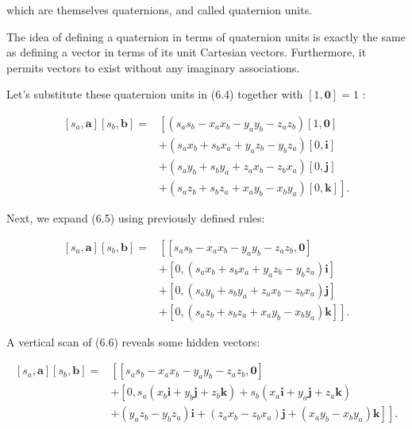 \documentclass[10pt]{article}
\begin{document}
which are themselves quaternions, and called quaternion units.

The idea of defining a quaternion in terms of quaternion units is exactly the same as defining a vector in terms of its unit Cartesian vectors. Furthermore, it permits vectors to exist without any imaginary associations.

Let's substitute these quaternion units in (6.4) together with $[1, \mathbf{0}]=1$ :

$$
\begin{aligned}
{\left[s_{a}, \mathbf{a}\right]\left[s_{b}, \mathbf{b}\right]=} & {\left[\left(s_{a} s_{b}-x_{a} x_{b}-y_{a} y_{b}-z_{a} z_{b}\right)[1, \mathbf{0}]\right.} \\
& +\left(s_{a} x_{b}+s_{b} x_{a}+y_{a} z_{b}-y_{b} z_{a}\right)[0, \mathbf{i}] \\
& +\left(s_{a} y_{b}+s_{b} y_{a}+z_{a} x_{b}-z_{b} x_{a}\right)[0, \mathbf{j}] \\
& \left.+\left(s_{a} z_{b}+s_{b} z_{a}+x_{a} y_{b}-x_{b} y_{a}\right)[0, \mathbf{k}]\right] .
\end{aligned}
$$

Next, we expand (6.5) using previously defined rules:

$$
\begin{aligned}
{\left[s_{a}, \mathbf{a}\right]\left[s_{b}, \mathbf{b}\right]=} & {\left[\left[s_{a} s_{b}-x_{a} x_{b}-y_{a} y_{b}-z_{a} z_{b}, \mathbf{0}\right]\right.} \\
& +\left[0,\left(s_{a} x_{b}+s_{b} x_{a}+y_{a} z_{b}-y_{b} z_{a}\right) \mathbf{i}\right] \\
& +\left[0,\left(s_{a} y_{b}+s_{b} y_{a}+z_{a} x_{b}-z_{b} x_{a}\right) \mathbf{j}\right] \\
& \left.+\left[0,\left(s_{a} z_{b}+s_{b} z_{a}+x_{a} y_{b}-x_{b} y_{a}\right) \mathbf{k}\right]\right] .
\end{aligned}
$$

A vertical scan of (6.6) reveals some hidden vectors:

$$
\begin{aligned}
{\left[s_{a}, \mathbf{a}\right]\left[s_{b}, \mathbf{b}\right]=} & {\left[\left[s_{a} s_{b}-x_{a} x_{b}-y_{a} y_{b}-z_{a} z_{b}, \mathbf{0}\right]\right.} \\
& +\left[0, s_{a}\left(x_{b} \mathbf{i}+y_{b} \mathbf{j}+z_{b} \mathbf{k}\right)+s_{b}\left(x_{a} \mathbf{i}+y_{a} \mathbf{j}+z_{a} \mathbf{k}\right)\right. \\
& \left.\left.+\left(y_{a} z_{b}-y_{b} z_{a}\right) \mathbf{i}+\left(z_{a} x_{b}-z_{b} x_{a}\right) \mathbf{j}+\left(x_{a} y_{b}-x_{b} y_{a}\right) \mathbf{k}\right]\right] .
\end{aligned}
$$
\end{document}
